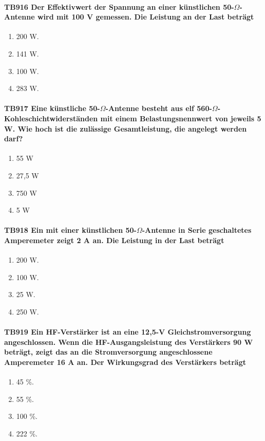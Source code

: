 \documentclass[8pt]{article}
\begin{document}
\begin{enumerate}
\begin{enumerate}[nolistsep,label=\Alph*]
\paragraph*{TB916 Der Effektivwert der Spannung an einer künstlichen 50-$\Omega$-Antenne wird mit 100 V gemessen. Die Leistung an der Last beträgt}
\begin{enumerate}[nolistsep,label=\Alph*]
\item 200 W.
\item 141 W.
\item 100 W.
\item 283 W.
\end{enumerate}

\paragraph*{TB917 Eine künstliche 50-$\Omega$-Antenne besteht aus elf 560-$\Omega$-Kohleschichtwiderständen mit einem Belastungsnennwert von jeweils 5 W. Wie hoch ist die zulässige Gesamtleistung, die angelegt werden darf?}
\begin{enumerate}[nolistsep,label=\Alph*]
\item 55 W
\item 27,5 W
\item 750 W
\item 5 W
\end{enumerate}

\paragraph*{TB918 Ein mit einer künstlichen 50-$\Omega$-Antenne in Serie geschaltetes Amperemeter zeigt 2 A an. Die Leistung in der Last beträgt}
\begin{enumerate}[nolistsep,label=\Alph*]
\item 200 W.
\item 100 W.
\item 25 W.
\item 250 W.
\end{enumerate}

\paragraph*{TB919 Ein HF-Verstärker ist an eine 12,5-V Gleichstromversorgung angeschlossen. Wenn die HF-Ausgangsleistung des Verstärkers 90 W beträgt, zeigt das an die Stromversorgung angeschlossene Amperemeter 16 A an. Der Wirkungsgrad des Verstärkers beträgt}
\begin{enumerate}[nolistsep,label=\Alph*]
\item 45 \%.
\item 55 \%.
\item 100 \%.
\item 222 \%.
\end{enumerate}


\end{enumerate}
\end{enumerate}
\end{document}
